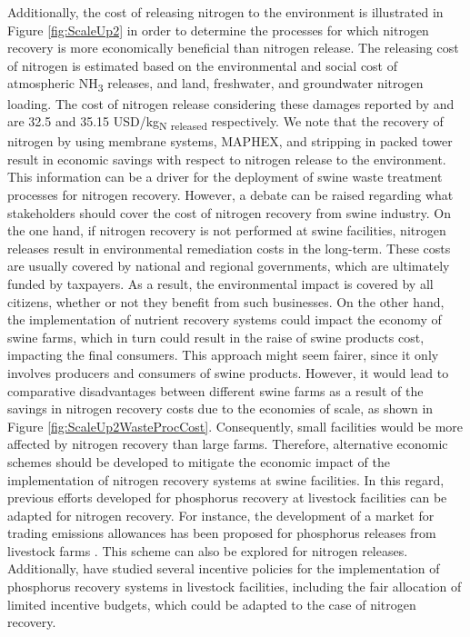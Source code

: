 \begin{refsection}[referencesCh6]
Additionally, the cost of releasing nitrogen to the environment is illustrated in Figure \ref{fig:ScaleUp2} in order to determine the processes for which nitrogen recovery is more economically beneficial than nitrogen release. The releasing cost of nitrogen is estimated based on the environmental and social cost of atmospheric NH\textsubscript{3} releases, and land, freshwater, and groundwater nitrogen loading. The cost of nitrogen release considering these damages reported by \citet{sobota2015cost} and \citet{compton2017assessing} are 32.5 and 35.15 USD/kg\textsubscript{N released} respectively. We note that the recovery of nitrogen by using membrane systems, MAPHEX, and stripping in packed tower result in economic savings with respect to nitrogen release to the environment. This information can be a driver for the deployment of swine waste treatment processes for nitrogen recovery. However, a debate can be raised regarding what stakeholders should cover the cost of nitrogen recovery from swine industry. 
On the one hand, if nitrogen recovery is not performed at swine facilities, nitrogen releases result in environmental remediation costs in the long-term. These costs are usually covered by national and regional governments, which are ultimately funded by taxpayers. As a result, the environmental impact is covered by all citizens, whether or not they benefit from such businesses. On the other hand, the implementation of nutrient recovery systems could impact the economy of swine farms, which in turn could result in the raise of swine products cost, impacting the final consumers. This approach might seem fairer, since it only involves producers and consumers of swine products. However, it would lead to comparative disadvantages between different swine farms as a result of the savings in nitrogen recovery costs due to the economies of scale, as shown in Figure \ref{fig:ScaleUp2WasteProcCost}. Consequently, small facilities would be more affected by nitrogen recovery than large farms. Therefore, alternative economic schemes should be developed to mitigate the economic impact of the implementation of nitrogen recovery systems at swine facilities. In this regard, previous efforts developed for phosphorus recovery at livestock facilities can be adapted for nitrogen recovery. For instance, the development of a market for trading emissions allowances has been proposed for phosphorus releases from livestock farms \citep{Sampat2}. This scheme can also be explored for nitrogen releases. Additionally, \citet{Policies} have studied several incentive policies for the implementation of phosphorus recovery systems in livestock facilities, including the fair allocation of limited incentive budgets, which could be adapted to the case of nitrogen recovery.


\end{refsection}
